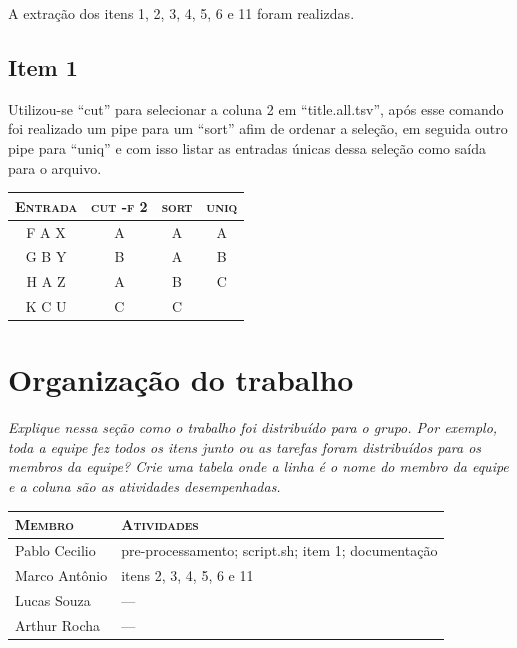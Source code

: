 \documentclass[12pt]{article}
\begin{document}
A extração dos itens 1, 2, 3, 4, 5, 6 e 11 foram realizdas.

\subsection*{Item 1}

Utilizou-se ``cut'' para selecionar a coluna 2 em ``title.all.tsv'', após esse comando foi realizado um pipe para um ``sort'' afim de ordenar a seleção, em seguida outro pipe para ``uniq'' e com isso listar as entradas únicas dessa seleção como saída para o arquivo.

\begin{table}[!htb]
    \begin{tabular}{ c c c c }
        \textsc{Entrada} & \textsc{cut -f 2} & \textsc{sort} & \textsc{uniq} \\ 
        \hline
        F A X & A & A & A \\ 
        G B Y & B & A & B \\
        H A Z & A & B & C \\
        K C U & C & C &   \\
    \end{tabular}
\end{table}

\section{Organização do trabalho}

\emph{Explique nessa seção como o trabalho foi distribuído para o grupo.
Por exemplo, toda a equipe fez todos os itens junto ou as tarefas foram 
distribuídos para os membros da equipe? Crie uma tabela onde a linha é o
nome do membro da equipe e a coluna são as atividades desempenhadas.}

\begin{table}[!htb]
    \begin{tabular}{p{5cm}p{7.5cm}}
    
        \textsc{Membro}      & \textsc{Atividades} \\ 
	    \hline
        Pablo Cecilio & pre-processamento; script.sh; item 1; documentação \\ 
        Marco Antônio & itens 2, 3, 4, 5, 6 e 11\\
        Lucas Souza & --- \\
        Arthur Rocha & --- \\

    \end{tabular}
\end{table}
\end{document}
